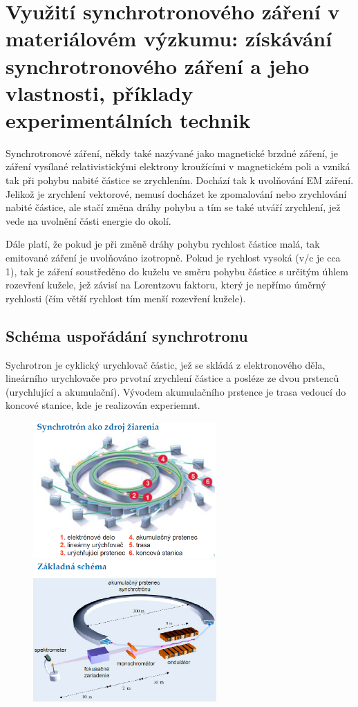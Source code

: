 \section[Využití synchrotronového záření v materiálovém výzkumu]{Využití synchrotronového záření v materiálovém výzkumu: získávání synchrotronového záření a jeho vlastnosti, příklady experimentálních technik}

Synchrotronové záření, někdy také nazývané jako magnetické brzdné záření, je záření vysílané relativistickými elektrony kroužícími v magnetickém poli a vzniká tak při pohybu nabité částice se zrychlením. Dochází tak k uvolňování EM záření. Jelikož je zrychlení vektorové, nemusí docházet ke zpomalování nebo zrychlování nabité částice, ale stačí změna dráhy pohybu a tím se také utváří zrychlení, jež vede na uvolnění části energie do okolí.

Dále platí, že pokud je při změně dráhy pohybu rychlost částice malá, tak emitované záření je uvolňováno izotropně. Pokud je rychlost vysoká (v/c je cca 1), tak je záření soustředěno do kuželu ve směru pohybu částice s určitým úhlem rozevření kužele, jež závisí na Lorentzovu faktoru, který je nepřímo úměrný rychlosti (čím větší rychlost tím menší rozevření kužele).

\subsection{Schéma uspořádání synchrotronu}

Sychrotron je cyklický urychlovač částic, jež se skládá z elektronového děla, lineárního urychlovače pro prvotní zrychlení částice a posléze ze dvou prstenců (urychlující a akumulační). Vývodem akumulačního prstence je trasa vedoucí do koncové stanice, kde je realizován experiemnt.

\begin{figure}[H]
	\includegraphics[width=7cm]{img/synchrotron.png}
	\includegraphics[width=7cm]{img/synchrotron2.png}
\end{figure}

